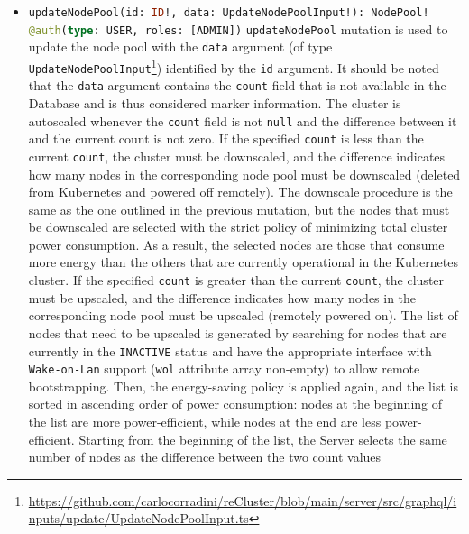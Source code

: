 \begin{itemize}
  \item \lstinline[language=graphql, deletekeywords={type}, morekeywords={[2]{NodePool, UpdateNodePoolInput, @auth}},
    morekeywords={[3]{USER, ADMIN}}, morekeywords={[4]{id, data, type, roles}},
    morekeywords={[5]{updateNodePool}}]{updateNodePool(id: ID!, data: UpdateNodePoolInput!): NodePool! @auth(type: USER, roles: [ADMIN])}
    \newline
    \texttt{updateNodePool} mutation is used to update the node pool with the \texttt{data}
    argument (of type \texttt{UpdateNodePoolInput}\footnote{\url{https://github.com/carlocorradini/reCluster/blob/main/server/src/graphql/inputs/update/UpdateNodePoolInput.ts}})
    identified by the \texttt{id} argument.
    \newline
    It should be noted that the \texttt{data} argument contains the \texttt{count}
    field that is not available in the Database and is thus considered marker information.
    The cluster is autoscaled whenever the \texttt{count} field is not \texttt{null}
    and the difference between it and the current count is not zero. If the specified
    \texttt{count} is less than the current \texttt{count}, the cluster must be
    downscaled, and the difference indicates how many nodes in the corresponding
    node pool must be downscaled (deleted from Kubernetes and powered off
    remotely). The downscale procedure is the same as the one outlined in the
    previous mutation, but the nodes that must be downscaled are selected with the
    strict policy of minimizing total cluster power consumption. As a result, the
    selected nodes are those that consume more energy than the others that are currently
    operational in the Kubernetes cluster. If the specified \texttt{count} is greater
    than the current \texttt{count}, the cluster must be upscaled, and the
    difference indicates how many nodes in the corresponding node pool must be
    upscaled (remotely powered on). The list of nodes that need to be upscaled is
    generated by searching for nodes that are currently in the \texttt{INACTIVE}
    status and have the appropriate interface with \texttt{Wake-on-Lan} support (\texttt{wol}
    attribute array non-empty) to allow remote bootstrapping. Then, the energy-saving
    policy is applied again, and the list is sorted in ascending order of power consumption:
    nodes at the beginning of the list are more power-efficient, while nodes at the
    end are less power-efficient. Starting from the beginning of the list, the Server
    selects the same number of nodes as the difference between the two count values

\end{itemize}
